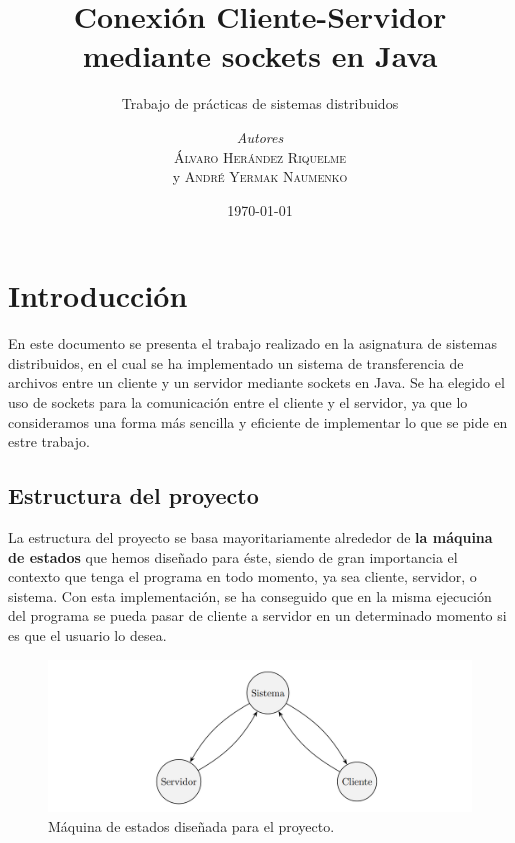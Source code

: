 \documentclass[a4paper, 12pt]{report}
\institute{Universidad Politécnica de Cartagena}
\title{Conexión Cliente-Servidor mediante sockets en Java}
\subtitle{Trabajo de prácticas de sistemas distribuidos }
\author{\textit{Autores}\\\textsc{Álvaro Herández Riquelme}\\ y \textsc{André Yermak Naumenko}}
\date{\today}
\begin{document}
\maketitle
\romantableofcontents

\newpage

\chapter{Introducción}

En este documento se presenta el trabajo realizado en la asignatura de sistemas distribuidos, en el cual se ha
implementado un sistema de transferencia de archivos entre un cliente y un servidor mediante sockets en Java.
Se ha elegido el uso de sockets para la comunicación entre el cliente y el servidor, ya que lo consideramos una
forma más sencilla y eficiente de implementar lo que se pide en estre trabajo.

\section{Estructura del proyecto}

La estructura del proyecto se basa mayoritariamente alrededor de \textbf{la máquina de estados} que hemos
diseñado para éste, siendo de gran importancia el contexto que tenga el programa en todo momento, ya sea
cliente, servidor, o sistema. Con esta implementación, se ha conseguido que en la misma ejecución del programa se pueda pasar de cliente a servidor en un determinado momento si es que el usuario lo desea.
%


\begin{figure}[H]
	\centering
	\includegraphics[scale=0.40]{resources/img/diagrama.png}
	\caption{Máquina de estados diseñada para el proyecto.}
	\label{fig:main}
\end{figure}
\end{document}
